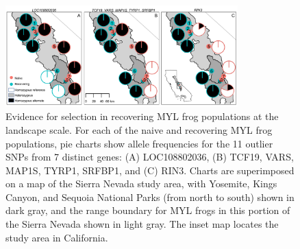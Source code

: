 \documentclass[9pt,twocolumn,twoside,lineno]{pnas-new}
\begin{document}
\showacknow{} %



\clearpage
\begin{figure}

{\centering \includegraphics[width=0.8\textwidth]{figures/allele_maps.png}

}

\caption{\label{fig-allelefrequencies}Evidence for selection in
recovering MYL frog populations at the landscape scale. For each of the
naive and recovering MYL frog populations, pie charts show allele
frequencies for the 11 outlier SNPs from 7 distinct genes: (A)
LOC108802036, (B) TCF19, VARS, MAP1S, TYRP1, SRFBP1, and (C) RIN3.
Charts are superimposed on a map of the Sierra Nevada study area, with
Yosemite, Kings Canyon, and Sequoia National Parks (from north to south)
shown in dark gray, and the range boundary for MYL frogs in this portion
of the Sierra Nevada shown in light gray. The inset map locates the
study area in California.}

\end{figure}

\newpage
\end{document}
